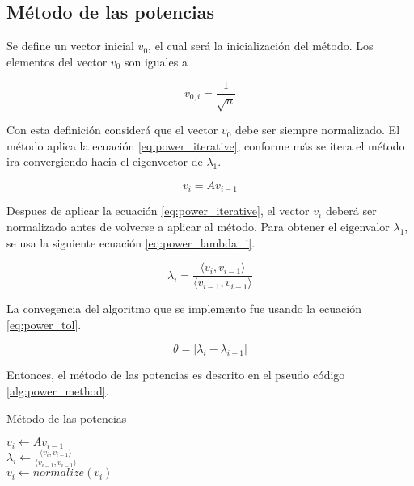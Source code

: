 \subsection{Método de las potencias \label{sec:power}}

Se define un vector inicial $v_0$, el cual será la inicialización del método.
Los elementos del vector $v_0$ son iguales a

\begin{equation*}
    v_{0,i} = \frac{1}{\sqrt{n}}
\end{equation*}

Con esta definición considerá que el vector $v_0$ debe ser siempre normalizado. El método aplica la ecuación \ref{eq:power_iterative}, conforme más se itera el método ira convergiendo hacia el eigenvector de $\lambda_1$.

\begin{equation}
    v_i = Av_{i-1} \label{eq:power_iterative}
\end{equation}

Despues de aplicar la ecuación \ref{eq:power_iterative}, el vector $v_i$ deberá ser normalizado antes de volverse a aplicar al método. Para obtener el eigenvalor $\lambda_1$, se usa la siguiente ecuación \ref{eq:power_lambda_i}.

\begin{equation}
    \lambda_i = \frac{\langle v_i , v_{i-1}\rangle}{\langle v_{i-1}, v_{i-1}\rangle} \label{eq:power_lambda_i}
\end{equation}

La convegencia del algoritmo que se implemento fue usando la ecuación \ref{eq:power_tol}.

\begin{equation}
    \theta = |\lambda_i - \lambda_{i-1}| \label{eq:power_tol}
\end{equation}

Entonces, el método de las potencias es descrito en el pseudo código \ref{alg:power_method}.

\begin{algorithm}[H]
    \caption{Método de las potencias}
    \label{alg:power_method}
    {
        $v_i \gets Av_{i-1}$\\
        $\lambda_i \gets \frac{\langle v_i , v_{i-1}\rangle}{\langle v_{i-1}, v_{i-1}\rangle}$\\
        $v_i \gets normalize(v_i)$\\
    }
\end{algorithm}